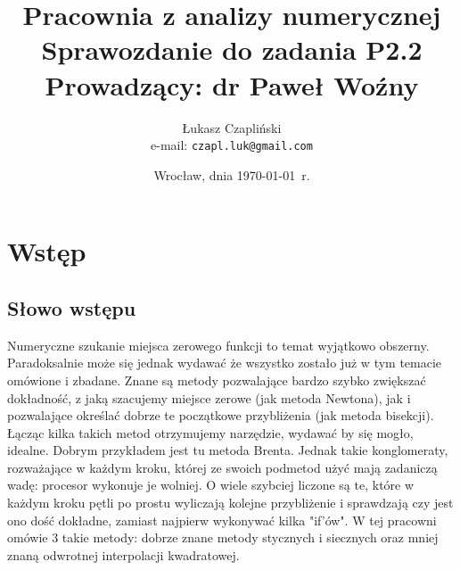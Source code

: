 \documentclass[11pt,wide]{mwart}
\title{{\textbf{Pracownia z analizy numerycznej\\}}
       {\Large Sprawozdanie do zadania \textbf{P2.2}\\}
       {\large Prowadzący: dr Paweł Woźny}}
\author{Łukasz Czapliński\\  e-mail: \texttt{czapl.luk@gmail.com}}
\date{Wrocław, dnia \today\ r.}
\begin{document}
\thispagestyle{empty}
\maketitle
\newpage
\section{Wstęp}
\subsection{Słowo wstępu}
Numeryczne szukanie miejsca zerowego funkcji to temat wyjątkowo obszerny. Paradoksalnie może się jednak wydawać że wszystko zostało już w tym temacie omówione i zbadane. Znane są metody pozwalające bardzo szybko zwiększać dokładność, z jaką szacujemy miejsce zerowe (jak metoda Newtona), jak i pozwalające określać dobrze te początkowe przybliżenia (jak metoda bisekcji). Łącząc kilka takich metod otrzymujemy narzędzie, wydawać by się mogło, idealne. Dobrym przykładem jest tu metoda Brenta. Jednak takie konglomeraty, rozważające w każdym kroku, której ze swoich podmetod użyć mają zadaniczą wadę: procesor wykonuje je wolniej. O wiele szybciej liczone są te, które w każdym kroku pętli po prostu wyliczają kolejne przybliżenie i sprawdzają czy jest ono dość dokładne, zamiast najpierw wykonywać kilka "if'ów". W tej pracowni omówie 3 takie metody: dobrze znane metody stycznych i siecznych oraz mniej znaną odwrotnej interpolacji kwadratowej.
\end{document}
